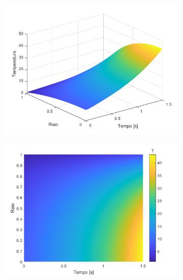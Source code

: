 \begin{figure}[H]
    \centering
    \caption{Perfis de temperatura para quarta forma de geração de calor: (a) perspectiva isométrica; (b) vista superior.}
    
    \begin{subfigure}{0.45\textwidth}
        \includegraphics[width=1\linewidth]{figures/results/Fig12.png} 
        \caption{}
    \end{subfigure}
    \begin{subfigure}{0.45\textwidth}
        \includegraphics[width=1\linewidth]{figures/results/Fig13.png}
        \caption{}
    \end{subfigure}
    
    \label{fig:surface04}
\end{figure}

